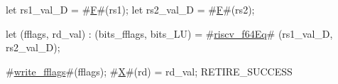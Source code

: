 let rs1_val_D = #\hyperref[sailRISCVzF]{F}#(rs1);
let rs2_val_D = #\hyperref[sailRISCVzF]{F}#(rs2);

let (fflags, rd_val) : (bits_fflags, bits_LU) =
    #\hyperref[sailRISCVzriscvzyf64Eq]{riscv\_f64Eq}# (rs1_val_D, rs2_val_D);

#\hyperref[sailRISCVzwritezyfflags]{write\_fflags}#(fflags);
#\hyperref[sailRISCVzX]{X}#(rd) = rd_val;
RETIRE_SUCCESS
